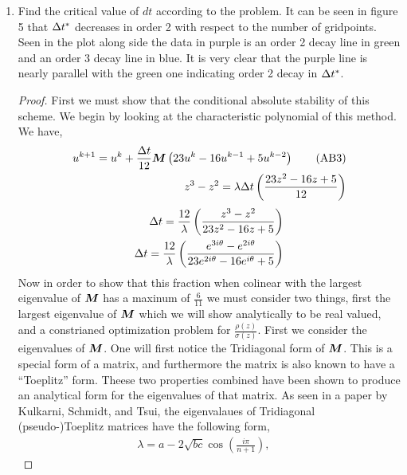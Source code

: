 \documentclass{article}
\begin{document}
\begin{enumerate}[label=\alph*)]
    \item Find the critical value of $dt$ according to the problem. It can be
    seen in figure 5 that $\Delta t^*$ decreases in order 2 with respect to the
    number of gridpoints. Seen in the plot along side the data in purple is an
    order 2 decay line in green and an order 3 decay line in blue. It is very
    clear that the purple line is nearly parallel with the green one indicating
    order 2 decay in $\Delta t^*$. 
        \begin{proof}
            First we must show that the conditional absolute stability of this
            scheme. We begin by looking at the characteristic polynomial of this
            method. We have, 
            \begin{align*}
                u^{k+1} = u^{k} + \frac{\Delta t}{12}\boldsymbol{M}\left(23u^{k} - 16u^{k-1}
                + 5u^{k-2}\right)
                \tag{AB3}\\
                z^3 - z^2 = \lambda\Delta t\left(\frac{23z^2 - 16z + 5}{12}\right)
            \end{align*}   
            \begin{align*}
                \Delta t = \frac{12}{\lambda}\left(\frac{z^3 - z^2}{23z^2 - 16z +
                5}\right)\\
                \Delta t = \frac{12}{\lambda}\left(\frac{e^{3i\theta} -
                e^{2i\theta}}{23e^{2i\theta} - 16e^{i\theta} +
                5}\right)
            \end{align*}
            Now in order to show that this fraction when colinear with the
            largest eigenvalue of $\boldsymbol{M}$ has a maxinum of $\frac{6}{11}$ we must consider two things, first
            the largest eigenvalue of $\boldsymbol{M}$ which we will show analytically
            to be real valued, and a constrianed optimization problem for
            $\frac{\rho(z)}{\sigma(z)}$. First we consider the eigenvalues of
            $\boldsymbol{M}$. One will first notice the Tridiagonal form of $\boldsymbol{M}$.
            This is a special form of a matrix, and furthermore the matrix is
            also known to have a ``Toeplitz'' form. Theese two properties combined
            have been shown to produce an analytical form for the eigenvalues of
            that matrix. As seen in a paper by Kulkarni, Schmidt, and Tsui, the
            eigenvalaues of Tridiagonal (pseudo-)Toeplitz matrices have the
            following form, 
            \begin{align*}
                \lambda = a - 2\sqrt{bc}\cos\left(\frac{i\pi}{n+1}\right), \quad

\end{align*}
\end{proof}
\end{enumerate}
\end{document}
